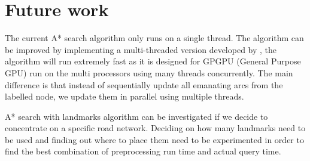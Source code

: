 \section{Future work}
The current A* search algorithm only runs on a single thread.
The algorithm can be improved by implementing a multi-threaded version developed
by \citet{Inam},
the algorithm will run extremely fast as it is designed for GPGPU (General Purpose GPU) run on the multi processors using many threads concurrently.
The main difference is that  
instead of sequentially update all emanating arcs from the labelled node,
we update them in parallel using multiple threads.

A* search with landmarks algorithm can be investigated
if we decide to concentrate on a specific road network.
Deciding on how many landmarks need to be used and finding out where to place them need to be experimented in order to find the best combination of preprocessing run time and actual query time.
